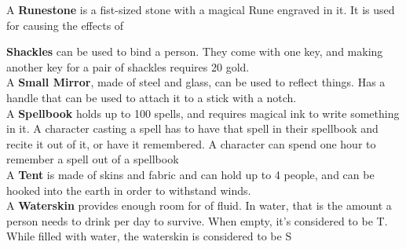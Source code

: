 A \textbf{Runestone} is a fist-sized stone with a magical Rune engraved in it. 
It is used for causing the effects of~

\textbf{Shackles} can be used to bind a person.
They come with one key, and making another key for a pair of shackles requires 20 gold.\\

A \textbf{Small Mirror}, made of steel and glass, can be used to reflect things.
Has a handle that can be used to attach it to a stick with a notch.\\

A \textbf{Spellbook} holds up to 100 spells, and requires magical ink to write something in it.
A character casting a spell has to have that spell in their spellbook and recite it out of it, or have it remembered.
A character can spend one hour to remember a spell out of a spellbook\\

A \textbf{Tent} is made of skins and fabric and can hold up to 4 people, and can be hooked into the earth in order to withstand winds.\\

A \textbf{Waterskin} provides enough room for  of fluid.
In water, that is the amount a person needs to drink per day to survive.
When empty, it's considered to be T.
While filled with water, the waterskin is considered to be S\\